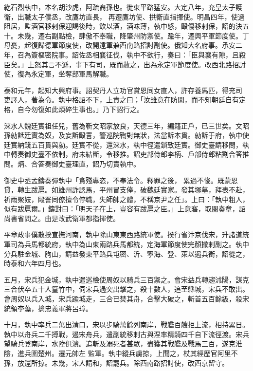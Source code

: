 \begin{pinyinscope}
 紇石烈執中，本名胡沙虎，阿疏裔孫也。徙東平路猛安。大定八年，充皇太子護衛，出職太子僕丞，改鷹坊直長，
 再遷鷹坊使、拱衛直指揮使。明昌四年，使過阻居，監酒官移剌保迎謁後時，飲以酒，酒味薄，執中怒，毆傷移剌保，詔的決五十。未幾，遷右副點檢，肆傲不奉職，降肇州防禦使。踰年，遷興平軍節度使。丁母憂，起復歸德軍節度使，改開遠軍兼西南路招討副使。俄知大名府事。承安二年，召為簽樞密院事。詔佐丞相襄征伐，執中不欲行，奏曰：「臣與襄有隙，且殺臣矣。」上怒其言不遜，事下有司，既而赦之，出為永定軍節度使。改西北路招討使，復為永定軍，坐奪部軍馬解職。



 泰和元年，起知大興府事。詔契丹人立功官賞恩同女直人，許存養馬匹，得充司
 吏譯人，著為令。執中格詔不下，上責之曰；「汝雖意在防閑，而不知朝廷自有定格，自今勿復如此煩碎生事也。」乃下詔行之。



 淶水人魏廷實祖任兒，舊為靳文昭家放良，天德三年，編籍正戶，已三世矣。文昭孫勍詆廷實為奴，及妄訴毆詈，警巡院鞫對無狀，法當訴本貫。勍訴于府，執中使廷實納錢五百貫與勍。廷實不從，還淶水，執中徑遣鎖致廷實。御史臺請移問，執中轉奏御史臺不依制，府未結斷，令移推。詔吏部侍郎李柄、戶部侍郎粘割合答推問。炳、合答奏御史臺理直，詔乃切責執中。



 御史中丞孟鑄奏彈執中「貪殘專恣，不奉法令。釋罪之後，
 累過不悛。既蒙恩貸，轉生跋扈。如雄州詐認馬，平州冒支俸，破魏廷實家。發其塚墓，拜表不赴，祈雨聚妓，毆詈同僚擅令停職，失師帥之體，不稱京尹之任」。上曰：「執中粗人，似有跋扈爾。」鑄對曰：「明天子在上，豈容有跋扈之臣。」上意寤，取閱奏章，詔尚書省問之。由是改武衛軍都指揮使。



 平章政事僕散揆宣撫河南，執中除山東東西路統軍使。揆行省汴京伐宋，升諸道統軍司為兵馬都統府，執中為山東兩路兵馬都統，定海軍節度使完顏撒剌副之。執中分兵駐金城、朐山，請益發東平路兵屯密、沂、寧海、登、萊以遏兵衝，詔從之，時泰和六年四月也。



 五月，宋兵犯金城，執中遣巡檢使周奴以騎兵三百禦之。會宋益兵轉趨沭陽，謀克三合伏卒五十人篁竹中，伺宋兵過突出擊之，殺十數人，追至縣城，宋兵不敢出。會周奴以兵入城，宋兵踰城走，三合已焚其舟，合擊大破之，斬首五百餘級，殺宋統領李藻，擒忠義軍將呂璋。



 十月，執中率兵二萬出清口，宋以步騎萬餘列南岸，戰艦百艘拒上流，相持累日。執中以舟兵二千搏戰，遏宋舟兵，遣副統移剌古與涅率精騎四千自下流徑渡。宋兵望騎兵登南岸，水陸俱潰。追斬及溺死者甚眾，盡獲其戰艦及戰馬三百，遂克淮陰，進兵圍楚州。遷元帥左
 監軍。執中縱兵虜掠，上聞之，杖其經歷官阿里不孫，放還所掠。未幾，宋人請和，詔罷兵。除西南路招討使，改西京留守。




\end{pinyinscope}
